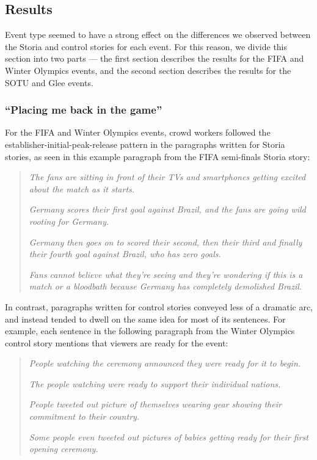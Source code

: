 \subsection{Results}
Event type seemed to have a strong effect on the differences we observed between the Storia and control stories for each event. For this reason, we divide this section into two parts --- the first section describes the results for the FIFA and Winter Olympics events, and the second section describes the results for the SOTU and Glee events.

\subsubsection{``Placing me back in the game''}
For the FIFA and Winter Olympics events, crowd workers followed the establisher-initial-peak-release pattern in the paragraphs written for Storia stories, as seen in this example paragraph from the FIFA semi-finals Storia story:

\begin{quote}
\emph{The fans are sitting in front of their TVs and smartphones getting excited about the match as it starts.}

\emph{Germany scores their first goal against Brazil, and the fans are going wild rooting for Germany.}

\emph{Germany then goes on to scored their second, then their third and finally their fourth goal against Brazil, who has zero goals.}

\emph{Fans cannot believe what they're seeing and they're wondering if this is a match or a bloodbath because Germany has completely demolished Brazil.}
\end{quote}

In contrast, paragraphs written for control stories conveyed less of a dramatic arc, and instead tended to dwell on the same idea for most of its sentences. For example, each sentence in the following paragraph from the Winter Olympics control story mentions that viewers are ready for the event: 

\begin{quote}
\emph{People watching the ceremony announced they were ready for it to begin.}

\emph{The people watching were ready to support their individual nations.}

\emph{People tweeted out picture of themselves wearing gear showing their commitment to their country.}

\emph{Some people even tweeted out pictures of babies getting ready for their first opening ceremony.}
\end{quote}











